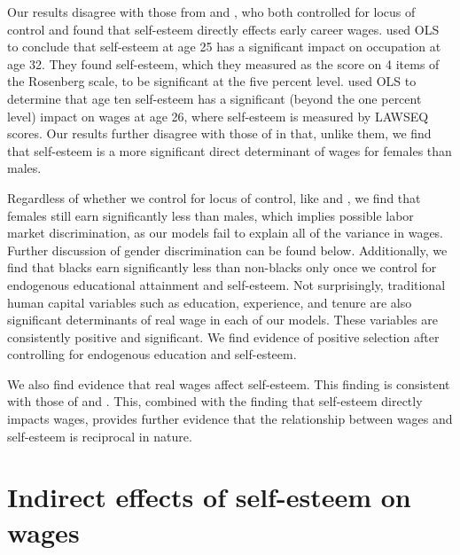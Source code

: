 \documentclass[12pt]{report}
\newcommand{\citee}[1]{\citename{#1} \citeyear{#1}}
\begin{document}
Our results disagree with those from \citee{W1999} and \citee{F2000}, who both controlled for locus of control and found that self-esteem directly effects early career wages. \citee{W1999} used OLS to conclude that self-esteem at age 25 has a significant impact on occupation at age 32. They found self-esteem, which they measured as the score on 4 items of the Rosenberg scale, to be significant at the five percent level. \citee{F2000} used OLS to determine that age ten self-esteem has a significant (beyond the one percent level) impact on wages at age 26, where self-esteem is measured by LAWSEQ scores. Our results further disagree with those of \citee{F2000} in that, unlike them, we find that self-esteem is a more significant direct determinant of wages for females than males.

Regardless of whether we control for locus of control, like \citee{GVD1997} and \citee{M2001}, we find that females still earn significantly less than males, which implies possible labor market discrimination, as our models fail to explain all of the variance in wages. Further discussion of gender discrimination can be found below. Additionally, we find that blacks earn significantly less than non-blacks only once we control for endogenous educational attainment and self-esteem. Not surprisingly, traditional human capital variables such as education, experience, and tenure are also significant determinants of real wage in each of our models. These variables are consistently positive and significant. We find evidence of positive selection after controlling for endogenous education and self-esteem.

We also find evidence that real wages affect self-esteem. This finding is consistent with those of \citee{BO1977} and \citee{GVD1996}. This, combined with the finding that self-esteem directly impacts wages, provides further evidence that the relationship between wages and self-esteem is reciprocal in nature.



\section*{Indirect effects of self-esteem on wages}
\end{document}
